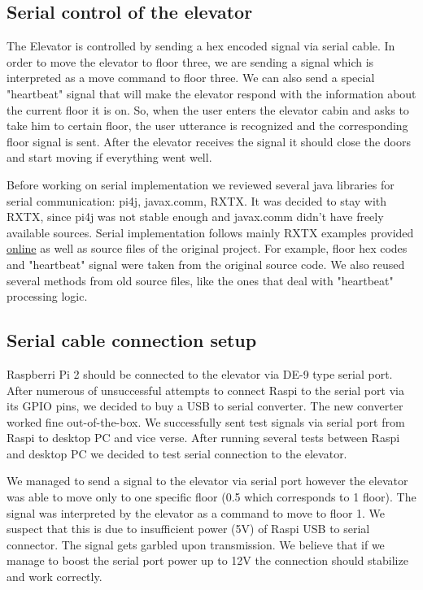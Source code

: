 \documentclass[a4paper, 12pt]{article}
\begin{document}
\subsection{Serial control of the elevator}
The Elevator is controlled by sending a hex encoded signal via serial cable.
In order to move the elevator to floor three, we are sending a signal which is interpreted as a move command to floor three.
We can also send a special "heartbeat" signal that will make the elevator respond with the information about the current floor it is on.
So, when the user enters the elevator cabin and asks to take him to certain floor, the user utterance is recognized and the corresponding floor signal is sent.
After the elevator receives the signal it should close the doors and start moving if everything went well.


Before working on serial implementation we reviewed several java libraries for serial communication: pi4j, javax.comm, RXTX.
It was decided to stay with RXTX, since pi4j was not stable enough and javax.comm didn't have freely available sources.
Serial implementation follows mainly RXTX examples provided \href{http://rxtx.qbang.org/wiki/index.php/Two_way_communcation_with_the_serial_port}{online} as well as source files of the original project.
For example, floor hex codes and "heartbeat" signal were taken from the original source code.
We also reused several methods from old source files, like the ones that deal with "heartbeat" processing logic.

\subsection{Serial cable connection setup}
Raspberri Pi 2 should be connected to the elevator via DE-9 type serial port.
After numerous of unsuccessful attempts to connect Raspi to the serial port via its GPIO pins, we decided to buy a USB to serial converter. 
The new converter worked fine out-of-the-box.
We successfully sent test signals via serial port from Raspi to desktop PC and vice verse.
After running several tests between Raspi and desktop PC we decided to test serial connection to the elevator.

We managed to send a signal to the elevator via serial port however the elevator was able to move only to one specific floor (0.5 which corresponds to 1 floor).
The signal was interpreted by the elevator as a command to move to floor 1.
We suspect that this is due to insufficient power (5V) of Raspi USB to serial connector.
The signal gets garbled upon transmission.
We believe that if we manage to boost the serial port power up to 12V the connection should stabilize and work correctly.
\end{document}
